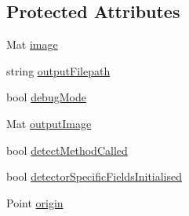 \subsection*{Protected Attributes}
\begin{DoxyCompactItemize}
\item 
Mat \hyperlink{classmultiscale_1_1analysis_1_1Detector_a523830a6cfe409694ce8327c3c736fbd}{image}
\item 
string \hyperlink{classmultiscale_1_1analysis_1_1Detector_a1a83df16d8afd347c0e1c9ddc41c9bee}{output\-Filepath}
\item 
bool \hyperlink{classmultiscale_1_1analysis_1_1Detector_a4b42f796957efd6ee0b8cf7645494a65}{debug\-Mode}
\item 
Mat \hyperlink{classmultiscale_1_1analysis_1_1Detector_a144e080a3af03c9bf3d8a80315823c86}{output\-Image}
\item 
bool \hyperlink{classmultiscale_1_1analysis_1_1Detector_ad565f471d9d7db7692da588ff0d6be2f}{detect\-Method\-Called}
\item 
bool \hyperlink{classmultiscale_1_1analysis_1_1Detector_a172b91067670a14a7707f24dc218f2af}{detector\-Specific\-Fields\-Initialised}
\item 
Point \hyperlink{classmultiscale_1_1analysis_1_1Detector_a002237e2ad684975a7c8b1e12dd7d780}{origin}
\end{DoxyCompactItemize}

